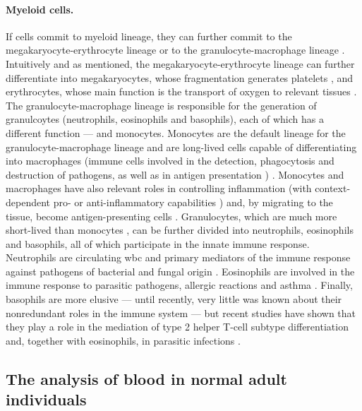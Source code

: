 \paragraph{Myeloid cells.} If cells commit to myeloid lineage, they can further commit to the megakaryocyte-erythrocyte lineage or to the granulocyte-macrophage lineage \cite{Akashi2000-ck}. Intuitively and as mentioned, the megakaryocyte-erythrocyte lineage can further differentiate into megakaryocytes, whose fragmentation generates platelets \cite{Wright1906-af}, and erythrocytes, whose main function is the transport of oxygen to relevant tissues \cite{Jensen2009-be}. The granulocyte-macrophage lineage is responsible for the generation of granulcoytes (neutrophils, eosinophils and basophils), each of which has a different function --- and monocytes. Monocytes are the default lineage for the granulocyte-macrophage lineage and are long-lived cells capable of differentiating into macrophages (immune cells involved in the detection, phagocytosis and destruction of pathogens, as well as in antigen presentation \cite{Mills2012-rc}) \cite{Jakubzick2017-is}. Monocytes and macrophages have also relevant roles in controlling inflammation (with context-dependent pro- or anti-inflammatory capabilities \cite{Rivollier2012-we,Bain2013-qe}) and, by migrating to the tissue, become antigen-presenting cells \cite{Jakubzick2013-az,Plantinga2013-kn}. Granulocytes, which are much more short-lived than monocytes \cite{Athens1961-cl}, can be further divided into neutrophils, eosinophils and basophils, all of which participate in the innate immune response. Neutrophils are circulating \ac{wbc} and primary mediators of the immune response against pathogens of bacterial and fungal origin \cite{Malech2014-dm}. Eosinophils are involved in the immune response to parasitic pathogens, allergic reactions and asthma \cite{Uhm2012-ja,Huang2016-br}. Finally, basophils are more elusive --- until recently, very little was known about their nonredundant roles in the immune system \cite{Miyake2017-rh,Karasuyama2011-ws} --- but recent studies have shown that they play a role in the mediation of type 2 helper T-cell subtype differentiation \cite{Hida2005-lj,Oh2007-yr} and, together with eosinophils, in parasitic infections \cite{Karasuyama2011-ws,Huang2016-br}.

\subsection{The analysis of blood in normal adult individuals}

